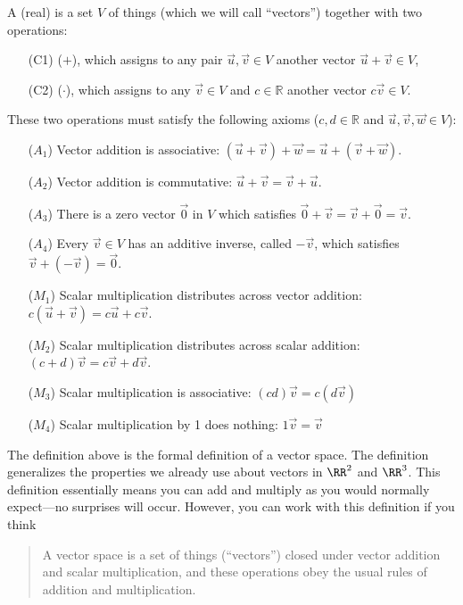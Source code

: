 \begin{definition}%
A (real)  is a set $V$ of things (which we will call ``vectors'') together with two operations:
\begin{enumerate}
	\item[(C1)]  ($+$), which assigns to any pair $\vec u, \vec v\in V$ another vector $\vec u+\vec v\in V$,
	\item[(C2)]  ($\cdot$), which assigns to any $\vec v \in V$ and $c\in {\mathbb{R}}$ another vector $c\vec v\in V$.
\end{enumerate}
%
These two operations must satisfy the following axioms ($c,d\in {\mathbb{R}}$ and $\vec u,\vec v,\vec w\in V$):
%
\begin{enumerate}
	\item[($A_1$)] Vector addition is associative: $(\vec u+\vec v)+\vec w = \vec u +(\vec v+\vec w)$.
	\item[($A_2$)] Vector addition is commutative: $\vec u+\vec v= \vec v+\vec u$.
	\item[($A_3$)] There is a zero vector $\vec 0$ in $V$ which satisfies $\vec 0+\vec v = \vec v+\vec 0=\vec v$.
	\item[($A_4$)] Every $\vec v\in V$ has an additive inverse, called $-\vec v$, which satisfies $\vec v+(-\vec v)=\vec 0$.
	\item[($M_1$)] Scalar multiplication distributes across vector addition: $c(\vec u+\vec v)= c\vec u + c\vec v$.
	\item[($M_2$)] Scalar multiplication distributes across scalar addition: $(c+d)\vec v= c\vec v+ d\vec v$.
	\item[($M_3$)] Scalar multiplication is associative: $(cd)\vec v = c(d\vec v)$
	\item[($M_4$)] Scalar multiplication by 1 does nothing: $1\vec v=\vec v$
\end{enumerate}
\end{definition}
The definition above is the formal definition of a vector space. The definition generalizes the properties we already use about vectors in $\RR^2$ and $\RR^3$. This definition essentially means you can add and multiply as you would normally expect---no surprises will occur. 
 However, you can work with this definition if you think 
\begin{quote}
A vector space is a set of things (``vectors'') closed under vector addition and scalar multiplication, and these operations obey the usual rules of addition and multiplication.
\end{quote}


